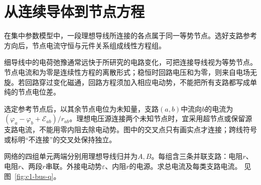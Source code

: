 \section{从连续导体到节点方程}\label{sec:c1-kirchhoff}
在集中参数模型中，一段理想导线所连接的各点属于同一等势节点。选好支路参考方向后，节点电流守恒与元件关系组成线性方程组。

细导线中的电荷弛豫通常远快于所研究的电路变化，可把连接导线视为等势节点。节点电流和为零是连续性方程的离散形式；稳恒时回路电压和为零，则来自电场无旋。若回路穿过变化磁通，回路方程须加入相应电动势，不能把所有支路都写成单纯的节点电位差。

选定参考节点后，以其余节点电位为未知量，支路$(a,b)$中流向$b$的电流为$(\varphi_a-\varphi_b+\mathcal E_{ab})/r_{ab}$。理想电压源连接两个未知节点时，宜采用超节点或保留源支路电流，不能用零内阻去除电动势。图中的交叉点只有画实点才连接；跨线符号或标明“不连接”的交叉处保持独立。

\begin{example}[理想导线归并后的电源电流]\label{ex:c1-bus}
网络的四组单元两端分别用理想导线归并为$A,B$。每组含三条并联支路：电阻$r$、电阻$r$、两段$r$串联。外接电动势$\varepsilon$、内阻$r$的电源。求总电流及每类支路电流。 见图~\ref{fig:c1-bus-q}。
\end{example}

